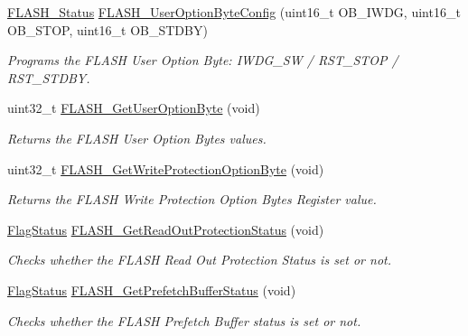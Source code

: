 \begin{DoxyCompactItemize}
\hyperlink{group___f_l_a_s_h___exported___types_gadc63a6f3404ff1f71229a66915e9cdc0}{F\+L\+A\+S\+H\+\_\+\+Status} \hyperlink{group___f_l_a_s_h___private___functions_gaae1c493bb06c930ceb84dedfdb7325f6}{F\+L\+A\+S\+H\+\_\+\+User\+Option\+Byte\+Config} (uint16\+\_\+t O\+B\+\_\+\+I\+W\+DG, uint16\+\_\+t O\+B\+\_\+\+S\+T\+OP, uint16\+\_\+t O\+B\+\_\+\+S\+T\+D\+BY)
\begin{DoxyCompactList}\small\item\em Programs the F\+L\+A\+SH User Option Byte\+: I\+W\+D\+G\+\_\+\+SW / R\+S\+T\+\_\+\+S\+T\+OP / R\+S\+T\+\_\+\+S\+T\+D\+BY. \end{DoxyCompactList}\item 
uint32\+\_\+t \hyperlink{group___f_l_a_s_h___private___functions_ga31441647fac5fbb38369613076737943}{F\+L\+A\+S\+H\+\_\+\+Get\+User\+Option\+Byte} (void)
\begin{DoxyCompactList}\small\item\em Returns the F\+L\+A\+SH User Option Bytes values. \end{DoxyCompactList}\item 
uint32\+\_\+t \hyperlink{group___f_l_a_s_h___private___functions_gac009e061562c7d36d7d2d00bb1c8aafa}{F\+L\+A\+S\+H\+\_\+\+Get\+Write\+Protection\+Option\+Byte} (void)
\begin{DoxyCompactList}\small\item\em Returns the F\+L\+A\+SH Write Protection Option Bytes Register value. \end{DoxyCompactList}\item 
\hyperlink{group___exported__types_ga89136caac2e14c55151f527ac02daaff}{Flag\+Status} \hyperlink{group___f_l_a_s_h___private___functions_ga57fe56770ff25b358f3e36bd70632e37}{F\+L\+A\+S\+H\+\_\+\+Get\+Read\+Out\+Protection\+Status} (void)
\begin{DoxyCompactList}\small\item\em Checks whether the F\+L\+A\+SH Read Out Protection Status is set or not. \end{DoxyCompactList}\item 
\hyperlink{group___exported__types_ga89136caac2e14c55151f527ac02daaff}{Flag\+Status} \hyperlink{group___f_l_a_s_h___private___functions_ga289bffe7f078d6a130222f03c59bc235}{F\+L\+A\+S\+H\+\_\+\+Get\+Prefetch\+Buffer\+Status} (void)
\begin{DoxyCompactList}\small\item\em Checks whether the F\+L\+A\+SH Prefetch Buffer status is set or not. \end{DoxyCompactList}\item 

\end{DoxyCompactItemize}
